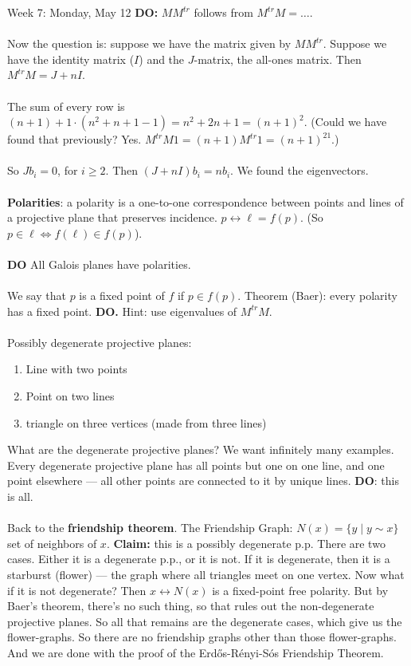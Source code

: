 \documentclass[12pt]{article}
\theoremstyle{remark}
\begin{document}
\begin{section}{Week 7: Monday, May 12}
\textbf{DO:} $MM^{tr}$ follows from $M^{tr}M = \ldots$.
\\\\
Now the question is: suppose we have the matrix given by $MM^{tr}$. Suppose we have the identity matrix ($I$) and the $J$-matrix, the all-ones matrix. Then $M^{tr}M  = J + nI$.
\\\\
The sum of every row is $(n+1) + 1 \cdot (n^2+n+1 -1 ) = n^2 + 2n + 1 = (n+1)^2$. (Could we have found that previously? Yes. $M^{tr} M 1 = (n+1)M^{tr}1 = (n+1)^21$.)
\\\\
So $Jb_i = 0$, for $i \geq 2$. Then $(J + nI)b_i = nb_i$. We found the eigenvectors.
\\\\
\textbf{Polarities}: a polarity is a one-to-one correspondence between points and lines of a projective plane that preserves incidence. $p \leftrightarrow \ell = f(p)$. (So $p \in \ell \Leftrightarrow f(\ell) \in f(p)$).
\\\\
\textbf{DO} All Galois planes have polarities.
\\\\
We say that $p$ is a fixed point of $f$ if $ p \in f(p)$. Theorem (Baer): every polarity has a fixed point. \textbf{DO.} Hint: use eigenvalues of $M^{tr}M$.
\\\\
Possibly degenerate projective planes: 
\begin{enumerate}
\item Line with two points
\item Point on two lines
\item triangle on three vertices (made from three lines)
\end{enumerate}
What are the degenerate projective planes? We want infinitely many examples. Every degenerate projective plane has all points but one on one line, and one point elsewhere --- all other points are connected to it by unique lines. \textbf{DO}: this is all.
\\\\
Back to the \textbf{friendship theorem}. The Friendship Graph: $N(x) = \{y \mid y \sim x\}$ set of neighbors of $x$. \textbf{Claim:} this is a possibly degenerate p.p. There are two cases. Either it is a degenerate p.p., or it is not. If it is degenerate, then it is a starburst (flower) --- the graph where all triangles meet on one vertex. Now what if it is not degenerate? Then $x \leftrightarrow N(x)$ is a fixed-point free polarity. But by Baer's theorem, there's no such thing, so that rules out the non-degenerate projective planes. So all that remains are the degenerate cases, which give us the flower-graphs. So there are no friendship graphs other than those flower-graphs. And we are done with the proof of the Erd\H{o}s-R\'enyi-S\'os Friendship Theorem.
\end{section}
\end{document}
